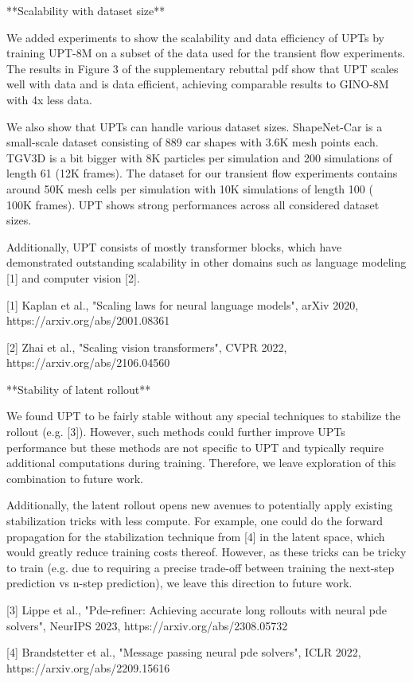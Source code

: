 **Scalability with dataset size**

We added experiments to show the scalability and data efficiency of UPTs by training UPT-8M on a subset of the data used for the transient flow experiments. The results in Figure 3 of the supplementary rebuttal pdf show that UPT scales well with data and is data efficient, achieving comparable results to GINO-8M with 4x less data.

We also show that UPTs can handle various dataset sizes. ShapeNet-Car is a small-scale dataset consisting of 889 car shapes with 3.6K mesh points each. TGV3D is a bit bigger with 8K particles per simulation and 200 simulations of length 61 (12K frames). The dataset for our transient flow experiments contains around 50K mesh cells per simulation with 10K simulations of length 100 (~ 100K frames).
UPT shows strong performances across all considered dataset sizes.


Additionally, UPT consists of mostly transformer blocks, which have demonstrated outstanding scalability in other domains such as language modeling [1] and computer vision [2].


[1] Kaplan et al., "Scaling laws for neural language models", arXiv 2020, https://arxiv.org/abs/2001.08361


[2] Zhai et al., "Scaling vision transformers", CVPR 2022, https://arxiv.org/abs/2106.04560


**Stability of latent rollout**


We found UPT to be fairly stable without any special techniques to stabilize the rollout (e.g. [3]). However, such methods could further improve UPTs performance but these methods are not specific to UPT and typically require additional computations during training. Therefore, we leave exploration of this combination to future work.

Additionally, the latent rollout opens new avenues to potentially apply existing stabilization tricks with less compute. For example, one could do the forward propagation for the stabilization technique from [4] in the latent space, which would greatly reduce training costs thereof. However, as these tricks can be tricky to train (e.g. due to requiring a precise trade-off between training the next-step prediction vs n-step prediction), we leave this direction to future work.



[3] Lippe et al., "Pde-refiner: Achieving accurate long rollouts with neural pde solvers", NeurIPS 2023, https://arxiv.org/abs/2308.05732

[4] Brandstetter et al., "Message passing neural pde solvers", ICLR 2022, https://arxiv.org/abs/2209.15616

